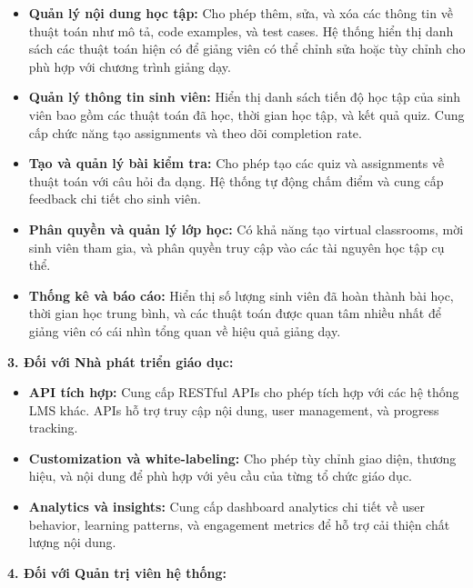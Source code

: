 \begin{itemize}
\item \textbf{Quản lý nội dung học tập:} Cho phép thêm, sửa, và xóa các thông tin về thuật toán như mô tả, code examples, và test cases. Hệ thống hiển thị danh sách các thuật toán hiện có để giảng viên có thể chỉnh sửa hoặc tùy chỉnh cho phù hợp với chương trình giảng dạy.

\item \textbf{Quản lý thông tin sinh viên:} Hiển thị danh sách tiến độ học tập của sinh viên bao gồm các thuật toán đã học, thời gian học tập, và kết quả quiz. Cung cấp chức năng tạo assignments và theo dõi completion rate.

\item \textbf{Tạo và quản lý bài kiểm tra:} Cho phép tạo các quiz và assignments về thuật toán với câu hỏi đa dạng. Hệ thống tự động chấm điểm và cung cấp feedback chi tiết cho sinh viên.

\item \textbf{Phân quyền và quản lý lớp học:} Có khả năng tạo virtual classrooms, mời sinh viên tham gia, và phân quyền truy cập vào các tài nguyên học tập cụ thể.

\item \textbf{Thống kê và báo cáo:} Hiển thị số lượng sinh viên đã hoàn thành bài học, thời gian học trung bình, và các thuật toán được quan tâm nhiều nhất để giảng viên có cái nhìn tổng quan về hiệu quả giảng dạy.
\end{itemize}

\textbf{3. Đối với Nhà phát triển giáo dục:}

\begin{itemize}
\item \textbf{API tích hợp:} Cung cấp RESTful APIs cho phép tích hợp với các hệ thống LMS khác. APIs hỗ trợ truy cập nội dung, user management, và progress tracking.

\item \textbf{Customization và white-labeling:} Cho phép tùy chỉnh giao diện, thương hiệu, và nội dung để phù hợp với yêu cầu của từng tổ chức giáo dục.

\item \textbf{Analytics và insights:} Cung cấp dashboard analytics chi tiết về user behavior, learning patterns, và engagement metrics để hỗ trợ cải thiện chất lượng nội dung.
\end{itemize}

\textbf{4. Đối với Quản trị viên hệ thống:}

